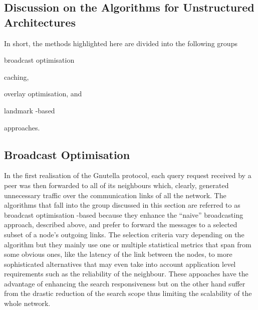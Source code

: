 \subsection{Discussion on the Algorithms for Unstructured Architectures}


 In short, the methods highlighted here are divided into the following
groups
\begin{inparaenum}
  \item broadcast optimisation
  \item caching,
  \item overlay optimisation, and
  \item landmark -based
\end{inparaenum}
 approaches.


\subsection{Broadcast Optimisation} 

In the first realisation of the Gnutella protocol, each query request received
by a peer was then forwarded to all of its neighbours which, clearly, generated
unnecessary traffic over the communication links of all the network. The
algorithms that fall into the group discussed in this section are referred
to as broadcast optimisation -based because they enhance the ``naive''
broadcasting approach, described above, and prefer to forward the messages to a
selected subset of a node's outgoing links. The selection criteria vary
depending on the algorithm but they mainly use one or multiple statistical
metrics that span from some obvious ones, like the latency of the link between
the nodes, to more sophisticated alternatives that may even take into account
application level requirements such as the reliability of the neighbour.
These appoaches have the advantage of enhancing the search responsiveness but on
the other hand suffer from the drastic reduction of the search scope thus
limiting the scalability of the whole network.

